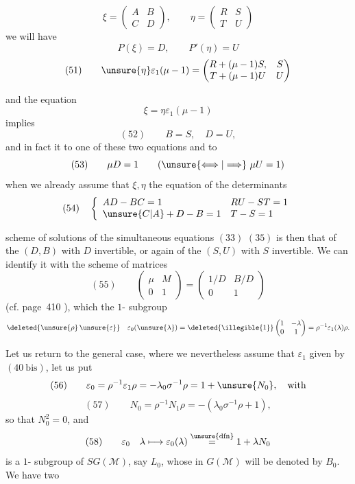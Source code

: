 \[
\xi=\begin{pmatrix}A&B\\C&D\end{pmatrix},\qquad
\eta=\begin{pmatrix}R&S\\T&U\end{pmatrix}
\]
we will have
\[
P(\xi)=D,\qquad P'(\eta)=U
\]
\[
(51)\qquad
\unsure{\eta}\varepsilon_1(\mu-1)
=\begin{pmatrix}
R+(\mu-1)S,&S\\
T+(\mu-1)U&U
\end{pmatrix}
\]


and the equation
\[
\xi=\eta\varepsilon_1(\mu-1)
\]
 implies
\[
(52)\qquad B=S,\quad D=U,
\]
and in fact it  to one of these two equations and to
\[
(53)\qquad \mu D=1\qquad (\unsure{\Longleftrightarrow|\Longrightarrow}\ \mu U=1)
\]
when we already assume that $\xi,\eta$  the equation of the  determinants 
\[
(54)\quad
\left\{\begin{array}{ll}
AD-BC=1 & RU-ST=1\\
\unsure{C|A}+D-B=1 & T-S=1
\end{array}\right.
\]

  scheme of solutions of the simultaneous equations $(33)$  $(35)$ is then that of the $(D,B)$ with $D$ invertible, or again of the $(S,U)$ with $S$ invertible. We can identify it with the scheme of matrices
\[
(55)\qquad
\begin{pmatrix}\mu&M\\0&1\end{pmatrix}
=\begin{pmatrix}1/D&B/D\\0&1\end{pmatrix}
\]
(cf. page~410 ), which  the $1$- subgroup
\[
\deleted{\unsure{\rho}\,\unsure{\varepsilon}}\quad
\varepsilon_0(\unsure{\lambda})=\deleted{\illegible{1}}
\begin{pmatrix}1&-\lambda\\0&1\end{pmatrix}
=\rho^{-1}\varepsilon_1(\lambda)\rho.
\]



Let us return to the general case, where we nevertheless assume that $\varepsilon_1$ given by $(40\ \mathrm{bis})$,  let us put
\[
(56)\qquad \varepsilon_0=\rho^{-1}\varepsilon_1\rho
=-\lambda_0\sigma^{-1}\rho=1+\unsure{N_0},\quad\text{with}
\]
\[
(57)\qquad N_0=\rho^{-1}N_1\rho=-(\lambda_0\sigma^{-1}\rho+1),
\]
so that $N_0^2=0$, and
\[
(58)\qquad \varepsilon_0\quad\lambda\longmapsto
\varepsilon_0(\lambda)\overset{\unsure{\mathrm{dfn}}}{=}1+\lambda N_0
\]
is a $1$- subgroup of $SG(\mathcal M)$, say $L_0$, whose  in $G(\mathcal M)$ will be denoted by $B_0$. We have two 

